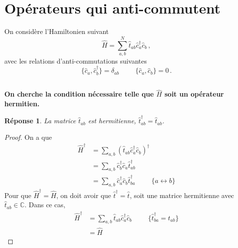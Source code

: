 \documentclass{article}
\numberwithin{equation}{section}
\theoremstyle{solution}
\newtheorem{solution}{Réponse}[section]
\begin{document}
        

\section{Opérateurs qui anti-commutent}
On considère l'Hamiltonien suivant
\begin{equation}\label{eq:hamiltonien5}
       \hat{H} = \sum_{a, b}^{N} \hat{t}_{ab}\hat{c}^{\dagger}_a \hat{c}_b \, ,
\end{equation} 
avec les relations d'anti-commutations suivantes
\begin{equation}\label{eq:commut5}
        \{\hat{c}_a, \hat{c}^{\dagger}_b \} = \delta_{ab} \hspace{1cm} \{ \hat{c}_a, \hat{c}_b\} = 0\, .
\end{equation} 

\subsection{}
\textbf{On cherche la condition nécessaire telle que $\hat{H}$ soit un opérateur hermitien.}
\begin{solution}
        La matrice $\hat{t}_{ab}$ est hermitienne, $\hat{t}_{ab}^{\dagger} = \hat{t}_{ab}$.
\end{solution}
\begin{proof}
On a que
\begin{align*}
       \hat{H}^{\dagger} &=  \sum_{a,b}(\hat{t}_{ab}\hat{c}^{\dagger}_a \hat{c}_b)^{\dagger} \\
                         &=  \sum_{a,b} \hat{c}^{\dagger}_b \hat{c}_a \hat{t}_{ab}^{\dagger} \\
                        &= \sum_{a,b} \hat{c}^{\dagger}_a \hat{c}_b \hat{t}_{ba}^{\dagger} \hspace{1cm} \{a \leftrightarrow b \}
\end{align*} 
Pour que $\hat{H}^{\dagger} = \hat{H}$, on doit avoir que $\hat{t}^{\dagger} = \hat{t}$, soit une matrice hermitienne avec $\hat{t}_{ab} \in \mathbb{C}$. Dans ce cas,
\begin{align*}
        \hat{H}^{\dagger} &= \sum_{a,b} \hat{t}_{ab}\hat{c}^{\dagger}_a\hat{c}_b\hspace{1cm} \{\hat{t}_{ba}^{\dagger} = \hat{t}_{ab} \} \\
                        &= \hat{H}
\end{align*}
\end{proof}
\end{document}
